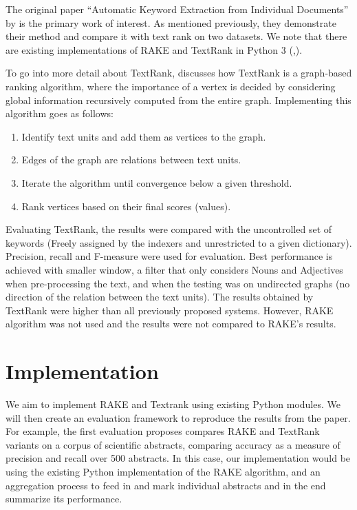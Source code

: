 \documentclass[11pt,a4paper]{article}
\begin{document}
The original paper “Automatic Keyword Extraction from Individual Documents” by \citet{1} is the primary work of interest. As mentioned previously, they demonstrate their method and compare it with text rank on two datasets. We note that there are existing implementations of RAKE and TextRank in Python 3 (\citet{2},\citet{3}).

To go into more detail about TextRank, \citet{4} discusses how TextRank is a graph-based ranking algorithm, where the importance of a vertex is decided by considering global information recursively computed from the entire graph. Implementing this algorithm goes as follows:

\begin{enumerate}
\item Identify text units and add them as vertices to the graph.
\item Edges of the graph are relations between text units.
\item Iterate the algorithm until convergence below a given threshold. 
\item Rank vertices based on their final scores (values).
\end{enumerate}   

Evaluating TextRank, the results were compared with the uncontrolled set of keywords (Freely assigned by the indexers and unrestricted to a given dictionary). Precision, recall and F-measure were used for evaluation. Best performance is achieved with smaller window, a filter that only considers Nouns and Adjectives when pre-processing the text, and when the testing was on undirected graphs (no direction of the relation between the text units). The results obtained by TextRank were higher than all previously proposed systems. However, RAKE algorithm was not used and the results were not compared to RAKE’s results.

\section{Implementation}

We aim to implement RAKE and Textrank using existing Python modules. We will then create an evaluation framework to reproduce the results from the paper. For example, the first evaluation \citet{1} proposes compares RAKE and TextRank variants on a corpus of scientific abstracts, comparing accuracy as a measure of precision and recall over 500 abstracts. In this case, our implementation would be using the existing Python implementation of the RAKE algorithm, and an aggregation process to feed in and mark individual abstracts and in the end summarize its performance.
\end{document}
